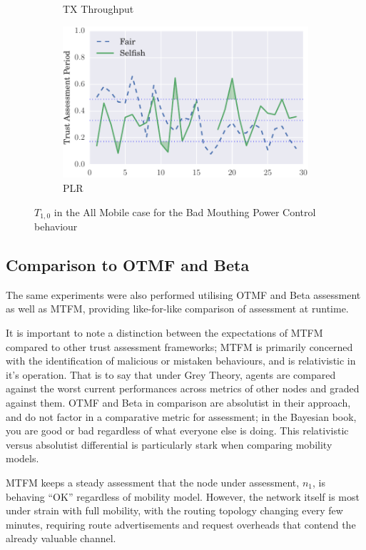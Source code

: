 \documentclass[runningheads,a4paper]{llncs}
\begin{document}
\begin{figure}
\begin{subfigure}{0.32\textwidth}
  \caption{TX Throughput}
  \label{fig:all_mobile_badmouthing_txthroughput}
\end{subfigure}
\begin{subfigure}{0.32\textwidth}
\centering
  \includegraphics[width=.95\linewidth]{img/trust_bella_all_mobile_emph_PLR_BadMouthingPowerControl.pdf}
  \caption{PLR}
  \label{fig:all_mobile_badmouthing_plr}
\end{subfigure}
\caption{$T_{1,0}$ in the All Mobile case for the Bad Mouthing Power Control behaviour}
\label{fig:all_mobile_badmouthing}
\end{figure}


\subsection{Comparison to OTMF and Beta}

The same experiments were also performed utilising OTMF and Beta assessment as well as MTFM, providing like-for-like comparison of assessment at runtime.

It is important to note a distinction between the expectations of MTFM compared to other trust assessment frameworks; MTFM is primarily concerned with the identification of malicious or mistaken behaviours, and is relativistic in it's operation.
That is to say that under Grey Theory, agents are compared against the worst current performances across metrics of other nodes and graded against them.
OTMF and Beta in comparison are absolutist in their approach, and do not factor in a comparative metric for assessment; in the Bayesian book, you are good or bad regardless of what everyone else is doing. 
This relativistic versus absolutist differential is particularly stark when comparing mobility models. 

MTFM keeps a steady assessment that the node under assessment, $n_1$, is behaving ``OK'' regardless of mobility model. 
However, the network itself is most under strain with full mobility, with the routing topology changing every few minutes, requiring route advertisements and request overheads that contend the already valuable channel.
\end{document}
